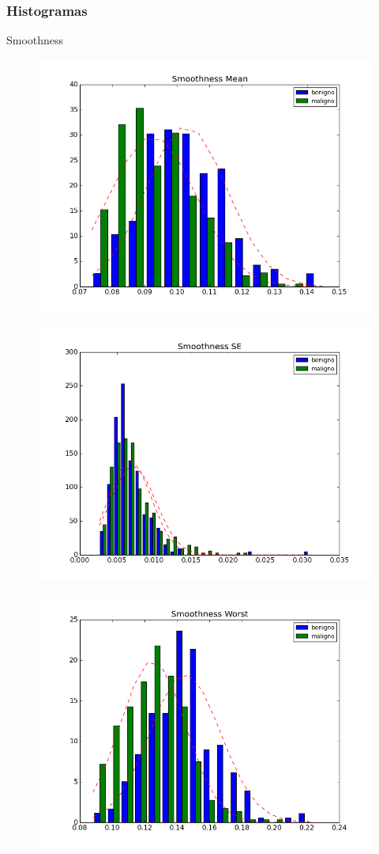 \documentclass{beamer}
\begin{document}
\begin{frame}

\frametitle{Histogramas}
Smoothness
\begin{figure}[H]
\centering
  \includegraphics[width=.3\linewidth]{./Histogramas/Smoothness_Mean}
  \label{fig:test1}
\end{figure}%

\begin{figure}[H]
\centering
\begin{minipage}{.3\textwidth}
  \centering
  \includegraphics[width=\linewidth]{./Histogramas/Smoothness_SE}
  \label{fig:test1}
\end{minipage}%
\begin{minipage}{.3\textwidth}
  \centering
  \includegraphics[width=\linewidth]{./Histogramas/Smoothness_Worst}
  \label{fig:test2}
\end{minipage}
\end{figure}

\end{frame}
\end{document}
